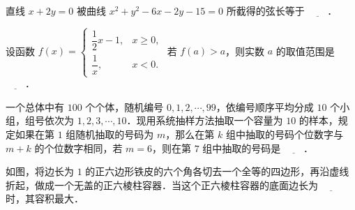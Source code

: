 \begin{question}
直线 $x + 2y = 0$ 被曲线 $x^2 + y^2 - 6x - 2y - 15 = 0$ 所截得的弦长等于 $\underline{\quad\quad}$．

\end{question}
\begin{question}
设函数 $f(x) = \begin{cases} \dfrac{1}{2}x - 1, & x \geqslant 0, \\ \dfrac{1}{x}, & x < 0. \end{cases}$ 若 $f(a) > a$，则实数 $a$ 的取值范围是 $\underline{\quad\quad}$．

\end{question}
\begin{question}
一个总体中有 $100$ 个个体，随机编号 $0, 1, 2, \cdots, 99$，依编号顺序平均分成 $10$ 个小组，组号依次为 $1, 2, 3, \cdots, 10$．现用系统抽样方法抽取一个容量为 $10$ 的样本，规定如果在第 $1$ 组随机抽取的号码为 $m$，那么在第 $k$ 组中抽取的号码个位数字与 $m + k$ 的个位数字相同，若 $m = 6$，则在第 $7$ 组中抽取的号码是 $\underline{\quad\quad}$．

\Needspace{0.4\textheight}
\end{question}
\begin{question}
如图，将边长为 $1$ 的正六边形铁皮的六个角各切去一个全等的四边形，再沿虚线折起，做成一个无盖的正六棱柱容器．当这个正六棱柱容器的底面边长为 $\underline{\quad\quad}$ 时，其容积最大．
\nopagebreak[4]
\begin{center}\end{center}
\nopagebreak[4]
\end{question}

